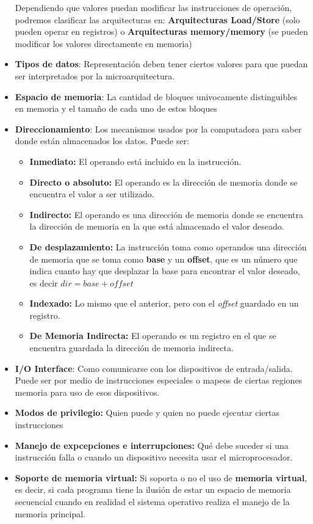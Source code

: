 \begin{itemize}
	Dependiendo que valores puedan modificar las instrucciones de operación, podremos clasificar las arquitecturas en: \textbf{Arquitecturas Load/Store} (solo pueden operar en registros) o \textbf{Arquitecturas memory/memory} (se pueden modificar los valores directamente en memoria)
	\item \textbf{Tipos de datos}: Representación deben tener ciertos valores para que puedan ser interpretados por la microarquitectura.
	\item \textbf{Espacio de memoria}: La cantidad de bloques univocamente distinguibles en memoria y el tamaño de cada uno de estos bloques
	\item \textbf{Direccionamiento}: Los mecanismos usados por la computadora para saber donde están almacenados los datos. Puede ser:
	\begin{itemize}
		\item \textbf{Inmediato:} El operando está incluido en la instrucción.
		\item \textbf{Directo o absoluto:} El operando es la dirección de memoria donde se encuentra el valor a ser utilizado.
		\item \textbf{Indirecto:} El operando es una dirección de memoria donde se encuentra la dirección de memoria en la que está almacenado el valor deseado.
		\item \textbf{De desplazamiento:} La instrucción toma como operandos una dirección de memoria que se toma como \textbf{base} y un \textbf{offset}, que es un número que indica cuanto hay que desplazar la base para encontrar el valor deseado, es decir $dir = base + offset$
		\item \textbf{Indexado:} Lo mismo que el anterior, pero con el \textit{offset} guardado en un registro.
		\item \textbf{De Memoria Indirecta:} El operando es un registro en el que se encuentra guardada la dirección de memoria indirecta.
	\end{itemize}
	\item \textbf{I/O Interface}: Como comunicarse con los dispositivos de entrada/salida. Puede ser por medio de instrucciones especiales o mapeos de ciertas regiones memoria para uso de esos dispositivos.
	\item \textbf{Modos de privilegio:} Quien puede y quien no puede ejecutar ciertas instrucciones 
	\item \textbf{Manejo de expcepciones e interrupciones:} Qué debe suceder si una instrucción falla o cuando un dispositivo necesita usar el microprocesador.
	\item \textbf{Soporte de memoria virtual:} Si soporta o no el uso de \textbf{memoria virtual}, es decir, si cada programa tiene la ilusión de estar un espacio de memoria secuencial cuando en realidad el sistema operativo realiza el manejo de la memoria principal.
\end{itemize}

